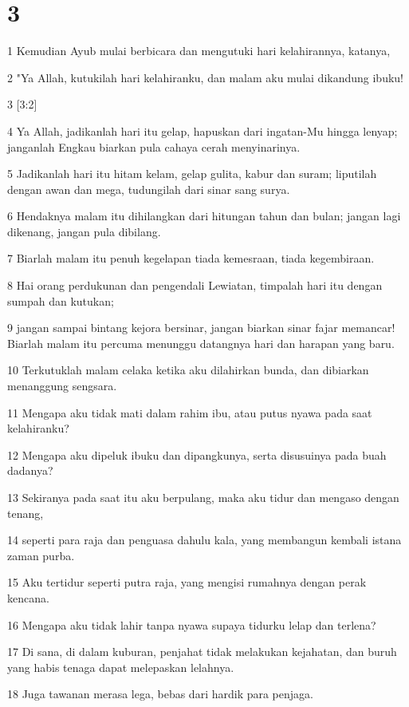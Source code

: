 \chapter{3}

\par 1 Kemudian Ayub mulai berbicara dan mengutuki hari kelahirannya, katanya,
\par 2 "Ya Allah, kutukilah hari kelahiranku, dan malam aku mulai dikandung ibuku!
\par 3 [3:2]
\par 4 Ya Allah, jadikanlah hari itu gelap, hapuskan dari ingatan-Mu hingga lenyap; janganlah Engkau biarkan pula cahaya cerah menyinarinya.
\par 5 Jadikanlah hari itu hitam kelam, gelap gulita, kabur dan suram; liputilah dengan awan dan mega, tudungilah dari sinar sang surya.
\par 6 Hendaknya malam itu dihilangkan dari hitungan tahun dan bulan; jangan lagi dikenang, jangan pula dibilang.
\par 7 Biarlah malam itu penuh kegelapan tiada kemesraan, tiada kegembiraan.
\par 8 Hai orang perdukunan dan pengendali Lewiatan, timpalah hari itu dengan sumpah dan kutukan;
\par 9 jangan sampai bintang kejora bersinar, jangan biarkan sinar fajar memancar! Biarlah malam itu percuma menunggu datangnya hari dan harapan yang baru.
\par 10 Terkutuklah malam celaka ketika aku dilahirkan bunda, dan dibiarkan menanggung sengsara.
\par 11 Mengapa aku tidak mati dalam rahim ibu, atau putus nyawa pada saat kelahiranku?
\par 12 Mengapa aku dipeluk ibuku dan dipangkunya, serta disusuinya pada buah dadanya?
\par 13 Sekiranya pada saat itu aku berpulang, maka aku tidur dan mengaso dengan tenang,
\par 14 seperti para raja dan penguasa dahulu kala, yang membangun kembali istana zaman purba.
\par 15 Aku tertidur seperti putra raja, yang mengisi rumahnya dengan perak kencana.
\par 16 Mengapa aku tidak lahir tanpa nyawa supaya tidurku lelap dan terlena?
\par 17 Di sana, di dalam kuburan, penjahat tidak melakukan kejahatan, dan buruh yang habis tenaga dapat melepaskan lelahnya.
\par 18 Juga tawanan merasa lega, bebas dari hardik para penjaga.

